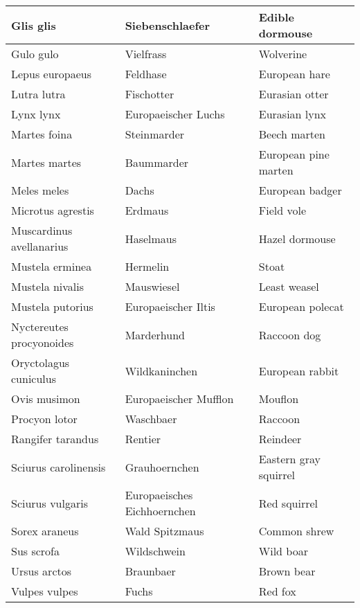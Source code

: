 \begin{table}[!ht]
\begin{tabular}{l|ll}
		Glis glis                & Siebenschlaefer             & Edible dormouse       \\
		\hline
		Gulo gulo                & Vielfrass                   & Wolverine             \\
		Lepus europaeus          & Feldhase                    & European hare         \\
		Lutra lutra              & Fischotter                  & Eurasian otter        \\
		Lynx lynx                & Europaeischer Luchs         & Eurasian lynx         \\
		Martes foina             & Steinmarder                 & Beech marten          \\
		\hline
		Martes martes            & Baummarder                  & European pine marten  \\
		Meles meles              & Dachs                       & European badger       \\
		Microtus agrestis        & Erdmaus                     & Field vole            \\
		Muscardinus avellanarius & Haselmaus                   & Hazel dormouse        \\
		Mustela erminea          & Hermelin                    & Stoat                 \\
		\hline
		Mustela nivalis          & Mauswiesel                  & Least weasel          \\
		Mustela putorius         & Europaeischer Iltis         & European polecat      \\
		Nyctereutes procyonoides & Marderhund                  & Raccoon dog           \\
		Oryctolagus cuniculus    & Wildkaninchen               & European rabbit       \\
		Ovis musimon             & Europaeischer Mufflon       & Mouflon               \\
		\hline
		Procyon lotor            & Waschbaer                   & Raccoon               \\
		Rangifer tarandus        & Rentier                     & Reindeer              \\
		Sciurus carolinensis     & Grauhoernchen               & Eastern gray squirrel \\
		Sciurus vulgaris         & Europaeisches Eichhoernchen & Red squirrel          \\
		Sorex araneus            & Wald Spitzmaus              & Common shrew          \\
		\hline
		Sus scrofa               & Wildschwein                 & Wild boar             \\
		Ursus arctos             & Braunbaer                   & Brown bear            \\
		Vulpes vulpes            & Fuchs                       & Red fox                
	\end{tabular}
\end{table}